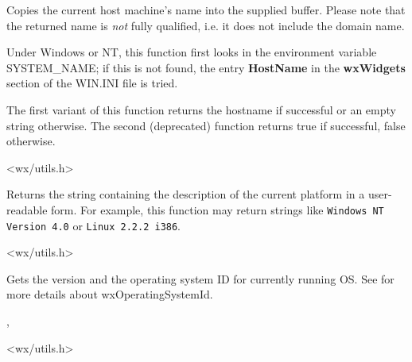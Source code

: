 Copies the current host machine's name into the supplied buffer. Please note
that the returned name is {\it not} fully qualified, i.e. it does not include
the domain name.

Under Windows or NT, this function first looks in the environment
variable SYSTEM\_NAME; if this is not found, the entry {\bf HostName}\rtfsp
in the {\bf wxWidgets} section of the WIN.INI file is tried.

The first variant of this function returns the hostname if successful or an
empty string otherwise. The second (deprecated) function returns true
if successful, false otherwise.




<wx/utils.h>


\label{wxgetosdescription}


Returns the string containing the description of the current platform in a
user-readable form. For example, this function may return strings like
{\tt Windows NT Version 4.0} or {\tt Linux 2.2.2 i386}.




<wx/utils.h>


\label{wxgetosversion}


Gets the version and the operating system ID for currently running OS.
See  for more details about wxOperatingSystemId.


,


<wx/utils.h>


\label{wxisplatformlittleendian}


